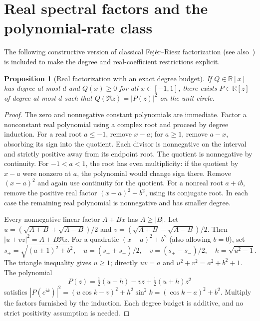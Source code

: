 \documentclass[11pt]{article}
\newtheorem{proposition}[theorem]{Proposition}
\newcommand{\R}{\mathbb R}
\begin{document}
\section{Real spectral factors and the polynomial-rate class}
The following constructive version of classical Fej\'er--Riesz factorization (see also~\cite{dritschel,dimitrov}) is included to make the degree and real-coefficient restrictions explicit.
 
\begin{proposition}[Real factorization with an exact degree budget]\label{rf}
If $Q\in\R[x]$ has degree at most $d$ and $Q(x)\ge0$ for all $x\in[-1,1]$, there exists $P\in\R[z]$ of degree at most $d$ such that $Q(\Re z)=|P(z)|^2$ on the unit circle.
\end{proposition}
\begin{proof}
The zero and nonnegative constant polynomials are immediate. Factor a nonconstant real polynomial using a complex root and proceed by degree induction. For a real root $a\le-1$, remove $x-a$; for $a\ge1$, remove $a-x$, absorbing its sign into the quotient. Each divisor is nonnegative on the interval and strictly positive away from its endpoint root. The quotient is nonnegative by continuity. For $-1<a<1$, the root has even multiplicity: if the quotient by $x-a$ were nonzero at $a$, the polynomial would change sign there. Remove $(x-a)^2$ and again use continuity for the quotient. For a nonreal root $a+ib$, remove the positive real factor $(x-a)^2+b^2$, using its conjugate root. In each case the remaining real polynomial is nonnegative and has smaller degree.

Every nonnegative linear factor $A+Bx$ has $A\ge |B|$. Let $u=(\sqrt{A+B}+\sqrt{A-B})/2$ and $v=(\sqrt{A+B}-\sqrt{A-B})/2$. Then $|u+vz|^2=A+B\Re z$. For a quadratic $(x-a)^2+b^2$ (also allowing $b=0$), set
\[
s_\pm=\sqrt{(a\pm1)^2+b^2},\quad
u=(s_++s_-)/2,\quad v=(s_+-s_-)/2,\quad
h=\sqrt{u^2-1}.
\]
The triangle inequality gives $u\ge1$; directly $uv=a$ and $u^2+v^2=a^2+b^2+1$. The polynomial
\[
P(z)=\tfrac12(u-h)-vz+\tfrac12(u+h)z^2
\]
satisfies $|P(e^{ik})|^2=(u\cos k-v)^2+h^2\sin^2 k=(\cos k-a)^2+b^2$. Multiply the factors furnished by the induction. Each degree budget is additive, and no strict positivity assumption is needed.
\end{proof}
\end{document}
